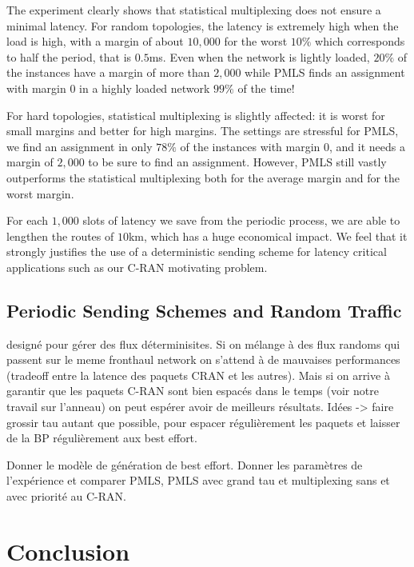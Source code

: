 \documentclass[10pt, conference, letterpaper]{IEEEtran}
\begin{document}
    The experiment clearly shows that statistical multiplexing does not ensure a minimal latency. 
    For random topologies, the latency is extremely high when the load is high, with a margin of about $10,000$ for the worst $10\%$ which corresponds to half the period, that is $0.5$ms. Even when the network is lightly loaded, $20\%$ of the instances have a margin of more than $2,000$ while PMLS finds an assignment with margin $0$ in a highly loaded network $99\%$ of the time! 
    
    For hard topologies, statistical multiplexing is slightly affected: it is worst for small margins and better for high margins. The settings are stressful for PMLS, we find an assignment in only $78\%$ of the instances with margin $0$, and it needs a margin of $2,000$ to be sure to find an assignment. However, PMLS still vastly outperforms the statistical multiplexing both for the average margin and for the worst margin. 
    
    For each $1,000$ slots of latency we save from the periodic process, we are able to lengthen the routes of $10$km, which has a huge economical impact. We feel that it strongly justifies the use of a deterministic sending scheme for latency critical applications such as our C-RAN motivating problem.    
     
    \subsection{Periodic Sending Schemes and Random Traffic}

    designé pour gérer des flux déterminisites. Si on mélange à des flux randoms qui passent sur le meme
    fronthaul network  on s'attend à de mauvaises performances (tradeoff entre la latence des paquets CRAN 
    et les autres). Mais si on arrive à garantir que les paquets C-RAN sont bien espacés dans le temps (voir notre travail sur l'anneau) on peut espérer avoir de meilleurs résultats.
    Idées -> faire grossir tau autant que possible, pour espacer régulièrement les paquets et 
    laisser de la BP régulièrement aux best effort. 

    Donner le modèle de génération de best effort.
    Donner les paramètres de l'expérience et comparer PMLS, PMLS avec grand tau et multiplexing
    sans et avec priorité au C-RAN.



 \section{Conclusion}
\end{document}
